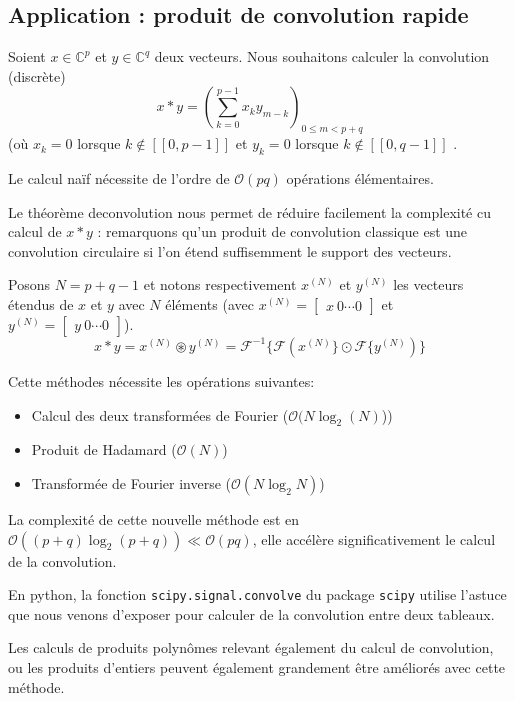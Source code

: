 \documentclass[11pt,oneside]{article}
\begin{document}
\subsection{Application : produit de convolution rapide}

Soient $x \in \mathbb{C}^p$ et $y \in \mathbb{C}^q$ deux vecteurs. Nous souhaitons calculer la convolution (discrète) $$x \ast y = (\sum_{k=0}^{p-1} x_k y_{m-k})_{0 \leq m < p + q}$$ (où $x_k = 0$ lorsque $k \notin [\![0,p-1]\!]$ et $y_k = 0$ lorsque $k \notin [\![0,q-1]\!]$ .

Le calcul naïf nécessite de l'ordre de $\mathcal{O}(pq)$ opérations élémentaires.

Le théorème deconvolution nous permet de réduire facilement la complexité cu calcul de $x \ast y$ : remarquons qu'un produit de convolution classique est une convolution circulaire si l'on étend suffisemment le support des vecteurs. 

Posons $N=p+q-1$ et notons respectivement $x^{(N)}$ et $y^{(N)}$ les vecteurs étendus de $x$ et $y$ avec $N$ éléments (avec $x^{(N)} = \begin{bmatrix}
    x ~ 0 \cdots 0
\end{bmatrix}$
et 
$y^{(N)} = \begin{bmatrix}
    y ~  0 \cdots 0
\end{bmatrix}$). 
$$x \ast y = x^{(N)} \circledast y^{(N)} = \mathcal{F}^{-1}\{\mathcal{F}(x^{(N)}\} \odot \mathcal{F}\{y^{(N)})\}$$

Cette méthodes nécessite les opérations suivantes: 
\begin{itemize}
    \item Calcul des deux transformées de Fourier ($\mathcal{O}(N \log_2 (N)$))
    \item Produit de Hadamard ($\mathcal{O}(N)$)
    \item Transformée de Fourier inverse ($\mathcal{O}(N \log_2 N)$)
\end{itemize}

La complexité de cette nouvelle méthode est en $\mathcal{O}((p+q) \log_2 (p+q) ) \ll \mathcal{O}(pq)$, elle accélère significativement le calcul de la convolution.

En python, la fonction \texttt{scipy.signal.convolve} du package \texttt{scipy} utilise l'astuce que nous venons d'exposer pour calculer de la convolution entre deux tableaux.

Les calculs de produits polynômes relevant également du calcul de convolution, ou les produits d'entiers peuvent également grandement être améliorés avec cette méthode.
\end{document}
